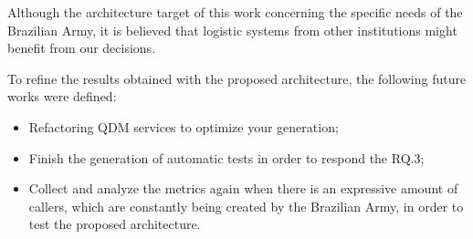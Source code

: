 Although the architecture target of this work concerning the specific needs of the Brazilian Army, it is believed that logistic systems from other institutions might benefit from our decisions.


To refine the results obtained with the proposed architecture, the following future works were defined:

\begin{itemize}
\item Refactoring QDM services to optimize your generation;
\item Finish the generation of automatic tests in order to respond the RQ.3;
\item Collect and analyze the metrics again when there is an expressive amount of callers, which are constantly being created by the Brazilian Army, in order to test the proposed architecture.
\end{itemize}